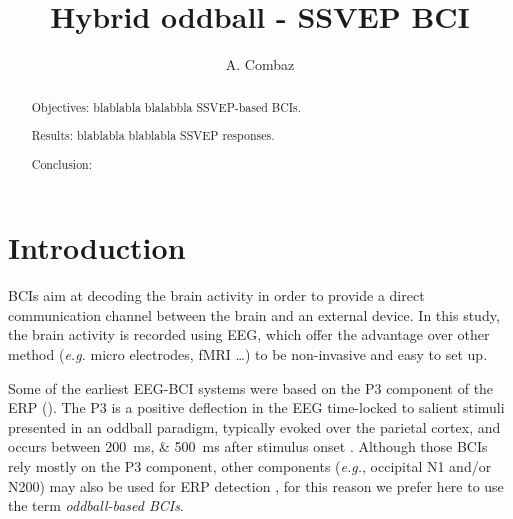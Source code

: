 \documentclass[10pt]{article}
\title{Hybrid oddball - SSVEP BCI}
\author[ * ]{A. Combaz}
\affil[ * ]{Computational Neuroscience Group, Laboratory for Neuro- and Psychophysiology, KU Leuven, Leuven, Belgium}
\begin{document}
\maketitle

\begin{abstract}
Objectives:
blablabla blalabbla \ac{SSVEP}-based BCIs.

Results:
blablabla blablabla \ac{SSVEP} responses.

Conclusion:
\end{abstract}


\acresetall

\section{Introduction}
\label{sec:1Intro}

\acp{BCI} aim at decoding the brain activity in order to provide a direct communication channel between the brain and an external device.
In this study, the brain activity is recorded using \ac{EEG}, which offer the advantage over other method (\emph{e.g.} micro electrodes, fMRI \ldots) to be non-invasive and easy to set up.

Some of the earliest \ac{EEG}-\ac{BCI} systems were based on the P3 component of the \ac{ERP} (\cite{Farwell1988, Donchin2000}).
The P3 is a positive deflection in the EEG time-locked to salient stimuli presented in an oddball paradigm, typically evoked over the parietal cortex, and occurs between \SIlist[list-units = single]{200;500}{\ms} after stimulus onset \cite{Sutton1965}.
Although those \acp{BCI} rely mostly on the P3 component, other components (\emph{e.g.}, occipital N1 and/or N200) may also be used for ERP detection \cite{Bianchi2010, Kaufmann2011}, for this reason we prefer here to use the term \emph{oddball-based \acp{BCI}}.
\end{document}

